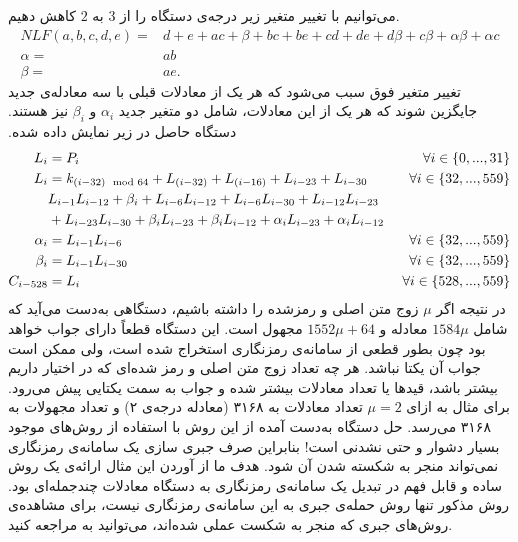 می‌توانیم با تغییر متغیر زیر درجه‌ی دستگاه را از 
$3$
 به 
 $2$
  کاهش دهیم.
\begin{align*}
NLF(a,b,c,d,e) =& d + e + ac + \beta + bc + be + cd + de + d\beta + c\beta + \alpha\beta + \alpha c\\
\alpha =& ab\\
\beta =& ae.
\end{align*}
تغییر متغیر فوق سبب می‌شود که هر یک از معادلات قبلی با سه معادله‌ی جدید جایگزین شوند که هر یک از این معادلات، شامل دو متغیر جدید 
$\alpha_{i}$
و
$\beta_{i}$
نیز هستند. دستگاه حاصل در زیر نمایش داده شده. 
{\small \begin{align*}
L_{i} &= P_{i}  \  &\fa i\in \{0,...,31\}\\
L_{i} &= k_{(i - 32)\mod 64} + L_{(i - 32)} + L_{(i - 16)} + L_{i - 23} + L_{i - 30} \ &\fa i\in\{32,...,559\}\\
\ &L_{i -1}L_{i - 12} + \beta_{i} + L_{i - 6}L_{i - 12} + L_{i - 6}L_{i - 30} + L_{i - 12}L_{i - 23}\ & \\
\ &  + L_{i - 23} L_{i - 30} + \beta_{i} L_{i - 23} 
+ \beta_{i}L_{i - 12} + \alpha_{i} L_{i - 23} + \alpha_{i} L_{i - 12} \ &  \ \\
\alpha_{i} &= L_{i-1}L_{i-6} \ &\fa i\in \{32,...,559\}\\
\beta_{i} &= L_{i-1}L_{i-30} \ & \fa i\in \{32,...,559\} \\
C_{i - 528} &= L_{i} \ &\fa i\in \{528,..., 559\}
\end{align*}}
در نتیجه اگر 
$\mu$
زوج متن اصلی و رمز‌شده‌ را داشته باشیم، دستگاهی به‌دست می‌آید که شامل 
$1584\mu$
معادله و 
$1552\mu + 64$
مجهول است. این دستگاه قطعاً دارای جواب خواهد بود چون بطور قطعی از سامانه‌ی رمزنگاری استخراج شده است، ولی ممکن است جواب آن یکتا نباشد. هر چه تعداد زوج متن اصلی و رمز شده‌ای که در اختیار  داریم بیشتر باشد، قیدها یا تعداد معادلات بیشتر شده و جواب به سمت یکتایی پیش می‌رود. برای مثال به ازای 
$\mu = 2$
تعداد معادلات به ۳۱۶۸  (معادله‌ درجه‌ی ۲) و تعداد مجهولات به ۳۱۶۸ می‌رسد.  حل دستگاه به‌دست آمده از این روش با استفاده از روش‌های موجود بسیار دشوار و حتی نشدنی است!  بنابراین صرف جبری سازی یک سامانه‌ی رمزنگاری نمی‌تواند منجر به شکسته شدن آن شود. هدف ما از آوردن این مثال ارائه‌ی یک روش ساده و قابل فهم در تبدیل یک سامانه‌ی رمزنگاری  به دستگاه معادلات چندجمله‌ای بود. روش مذکور تنها روش حمله‌ی جبری به این سامانه‌ی رمزنگاری نیست، برای مشاهده‌ی روش‌های جبری که منجر به شکست عملی 
شده‌اند، می‌توانید به  
\cite{bard2009algebraic, courtois2008algebraic}
مراجعه کنید. 
\newpage
